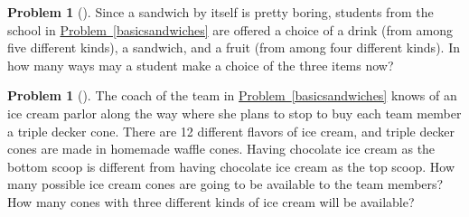 \documentclass[10pt,]{book}
\theoremstyle{plain}
\theoremstyle{definition}
\newtheorem{activity}[project]{Problem}
\theoremstyle{definition}
\numberwithin{equation}{chapter}
\begin{document}
\begin{activity}[] \label{completelunch}
Since a sandwich by itself is pretty boring, students from the school in \hyperref[basicsandwiches]{Problem~\ref{basicsandwiches}} are offered a choice of a drink (from among five different kinds), a sandwich, and a fruit (from among four different kinds). In how many ways may a student make a choice of the three items now?%
\end{activity}
\begin{activity}[] \label{tripledeckercone}
The coach of the team in \hyperref[basicsandwiches]{Problem~\ref{basicsandwiches}} knows of an ice cream parlor along the way where she plans to stop to buy each team member a triple decker cone. There are 12 different flavors of ice cream, and triple decker cones are made in homemade waffle cones. Having chocolate ice cream as the bottom scoop is different from having chocolate ice cream as the top scoop. How many possible ice cream cones are going to be available to the team members? How many cones with three different kinds of ice cream will be available?%
\end{activity}
\end{document}
